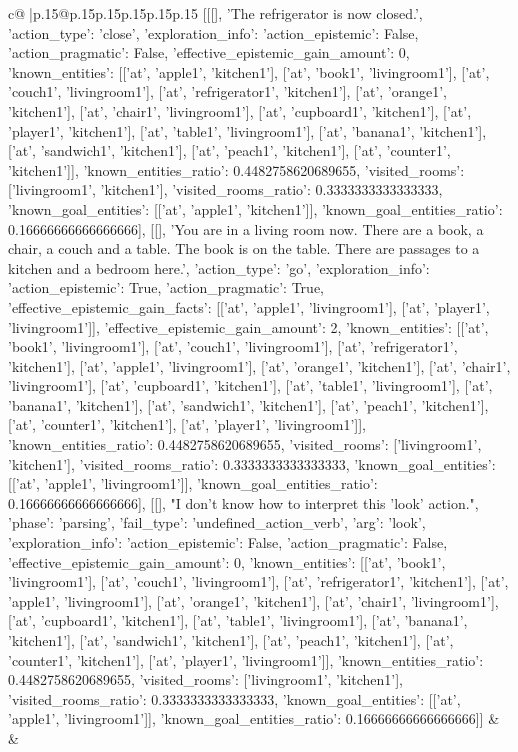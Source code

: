 \documentclass{article}
\begin{document}
{\begin{supertabular}{c@{$\;$}|p{.15\linewidth}@{}p{.15\linewidth}p{.15\linewidth}p{.15\linewidth}p{.15\linewidth}p{.15\linewidth}}
{{{	 [[[], 'The refrigerator is now closed.', {'action_type': 'close', 'exploration_info': {'action_epistemic': False, 'action_pragmatic': False, 'effective_epistemic_gain_amount': 0, 'known_entities': [['at', 'apple1', 'kitchen1'], ['at', 'book1', 'livingroom1'], ['at', 'couch1', 'livingroom1'], ['at', 'refrigerator1', 'kitchen1'], ['at', 'orange1', 'kitchen1'], ['at', 'chair1', 'livingroom1'], ['at', 'cupboard1', 'kitchen1'], ['at', 'player1', 'kitchen1'], ['at', 'table1', 'livingroom1'], ['at', 'banana1', 'kitchen1'], ['at', 'sandwich1', 'kitchen1'], ['at', 'peach1', 'kitchen1'], ['at', 'counter1', 'kitchen1']], 'known_entities_ratio': 0.4482758620689655, 'visited_rooms': ['livingroom1', 'kitchen1'], 'visited_rooms_ratio': 0.3333333333333333, 'known_goal_entities': [['at', 'apple1', 'kitchen1']], 'known_goal_entities_ratio': 0.16666666666666666}}], [[], 'You are in a living room now. There are a book, a chair, a couch and a table. The book is on the table. There are passages to a kitchen and a bedroom here.', {'action_type': 'go', 'exploration_info': {'action_epistemic': True, 'action_pragmatic': True, 'effective_epistemic_gain_facts': [['at', 'apple1', 'livingroom1'], ['at', 'player1', 'livingroom1']], 'effective_epistemic_gain_amount': 2, 'known_entities': [['at', 'book1', 'livingroom1'], ['at', 'couch1', 'livingroom1'], ['at', 'refrigerator1', 'kitchen1'], ['at', 'apple1', 'livingroom1'], ['at', 'orange1', 'kitchen1'], ['at', 'chair1', 'livingroom1'], ['at', 'cupboard1', 'kitchen1'], ['at', 'table1', 'livingroom1'], ['at', 'banana1', 'kitchen1'], ['at', 'sandwich1', 'kitchen1'], ['at', 'peach1', 'kitchen1'], ['at', 'counter1', 'kitchen1'], ['at', 'player1', 'livingroom1']], 'known_entities_ratio': 0.4482758620689655, 'visited_rooms': ['livingroom1', 'kitchen1'], 'visited_rooms_ratio': 0.3333333333333333, 'known_goal_entities': [['at', 'apple1', 'livingroom1']], 'known_goal_entities_ratio': 0.16666666666666666}}], [[], "I don't know how to interpret this 'look' action.", {'phase': 'parsing', 'fail_type': 'undefined_action_verb', 'arg': 'look', 'exploration_info': {'action_epistemic': False, 'action_pragmatic': False, 'effective_epistemic_gain_amount': 0, 'known_entities': [['at', 'book1', 'livingroom1'], ['at', 'couch1', 'livingroom1'], ['at', 'refrigerator1', 'kitchen1'], ['at', 'apple1', 'livingroom1'], ['at', 'orange1', 'kitchen1'], ['at', 'chair1', 'livingroom1'], ['at', 'cupboard1', 'kitchen1'], ['at', 'table1', 'livingroom1'], ['at', 'banana1', 'kitchen1'], ['at', 'sandwich1', 'kitchen1'], ['at', 'peach1', 'kitchen1'], ['at', 'counter1', 'kitchen1'], ['at', 'player1', 'livingroom1']], 'known_entities_ratio': 0.4482758620689655, 'visited_rooms': ['livingroom1', 'kitchen1'], 'visited_rooms_ratio': 0.3333333333333333, 'known_goal_entities': [['at', 'apple1', 'livingroom1']], 'known_goal_entities_ratio': 0.16666666666666666}}]] 
	  } 
	   } 
	   } 
	 & & \\ 
 


\end{supertabular}}
\end{document}

